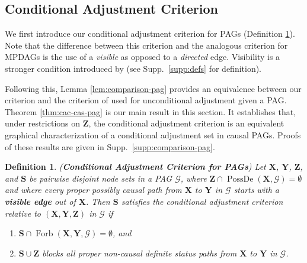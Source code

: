 \documentclass[twoside]{article}
\newtheorem{definition}[theorem]{Definition}
\DeclareMathOperator{\PossDe}{PossDe}
\DeclareMathOperator{\Forb}{Forb}
\newcommand{\fb}[2][X,Y]{\Forb(\mb{#1},#2)}
\newcommand{\mb}[1]{\mathbf{#1}}
\newcommand{\g}[1][G]{\mathcal{#1}}
\begin{document}

\subsection{Conditional Adjustment Criterion}
\label{sec:cond-adj-pag}

We first introduce our conditional adjustment criterion for PAGs (Definition \ref{def:cac-pag}). Note that the difference between this criterion and the analogous criterion for MPDAGs is the use of a \textit{visible} as opposed to a \textit{directed} edge. Visibility is a stronger condition introduced by \cite{zhang2008causal} (see Supp.\ \ref{supp:defs} for definition).

Following this, Lemma \ref{lem:comparison-pag} provides an equivalence between our criterion and the criterion of \cite{perkovic2018complete} used for unconditional adjustment given a PAG. Theorem \ref{thm:cac-cas-pag} is our main result in this section. It establishes that, under restrictions on $\mb{Z}$, the conditional adjustment criterion is an equivalent graphical characterization of a conditional adjustment set in causal PAGs. Proofs of these results are given in Supp.\ \ref{supp:comparison-pag}.



\begin{definition}
\label{def:cac-pag}
{\normalfont (\textbf{Conditional Adjustment Criterion for PAGs})} 
    Let $\mb{X}$, $\mb{Y}$, $\mb{Z}$, and $\mb{S}$ be pairwise disjoint node sets in a PAG $\g$, where $\mb{Z} \cap \PossDe(\mb{X},\g) = \emptyset$ and where every proper possibly causal path from $\mb{X}$ to $\mb{Y}$ in $\g$ starts with a \textbf{visible edge} out of $\mb{X}$. Then $\mb{S}$ satisfies the conditional adjustment criterion relative to $(\mb{X},\mb{Y},\mb{Z})$ in $\g$ if 
    \begin{enumerate}[label=\emph{(\alph*)}]
        \item \label{def:cac-pag-a} $\mb{S} \cap \fb{\g} = \emptyset$, and
        \item $\mb{S} \cup \mb{Z}$ blocks all proper non-causal definite status paths from $\mb{X}$ to $\mb{Y}$ in $\g$.
    \end{enumerate}
\end{definition}





\end{document}
